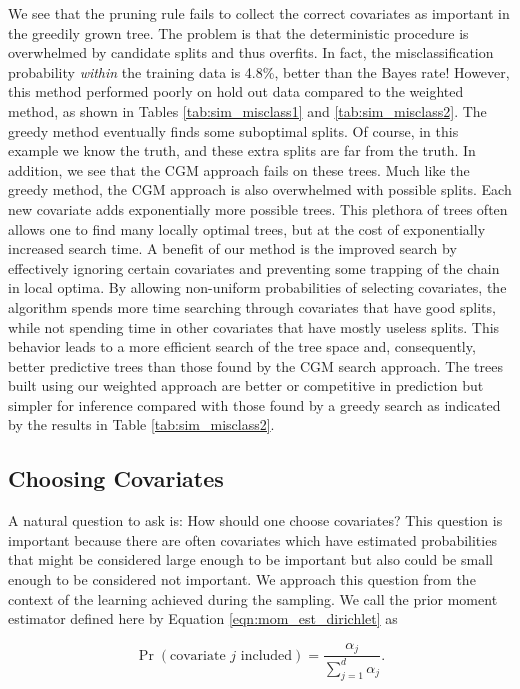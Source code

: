 We see that the pruning rule fails to collect the correct covariates as important in the greedily grown tree. The problem is that the deterministic procedure is overwhelmed by candidate splits and thus overfits. In fact, the misclassification probability \emph{within} the training data is 4.8\%, better than the Bayes rate! However, this method performed poorly on hold out data compared to the weighted method, as shown in Tables \ref{tab:sim_misclass1} and \ref{tab:sim_misclass2}. The greedy method eventually finds some suboptimal splits. Of course, in this example we know the truth, and these extra splits are far from the truth. In addition, we see that the CGM approach fails on these trees. Much like the greedy method, the CGM approach is also overwhelmed with possible splits. Each new covariate adds exponentially more possible trees. This plethora of trees often allows one to find many locally optimal trees, but at the cost of exponentially increased search time. A benefit of our method is the improved search by effectively ignoring certain covariates and preventing some trapping of the chain in local optima. By allowing non-uniform probabilities of selecting covariates, the algorithm spends more time searching through covariates that have good splits, while not spending time in other covariates that have mostly useless splits. This behavior leads to a more efficient search of the tree space and, consequently, better predictive trees than those found by the CGM search approach. The trees built using our weighted approach are better or competitive in prediction but simpler for inference compared with those found by a greedy search as indicated by the results in Table \ref{tab:sim_misclass2}. 

\subsection{Choosing Covariates}
A natural question to ask is: How should one choose covariates? This question is important because there are often covariates which have estimated probabilities that might be considered large enough to be important but also could be small enough to be considered   not important. We approach this question from the context of the learning achieved during the sampling. We call the prior moment estimator defined here by Equation \ref{eqn:mom_est_dirichlet} as

\begin{equation}\label{eqn:mom_est_dirichlet}
\Pr(\text{covariate $j$ included})= \frac{\alpha_j}{\sum_{j=1}^d \alpha_j}.
\end{equation}

